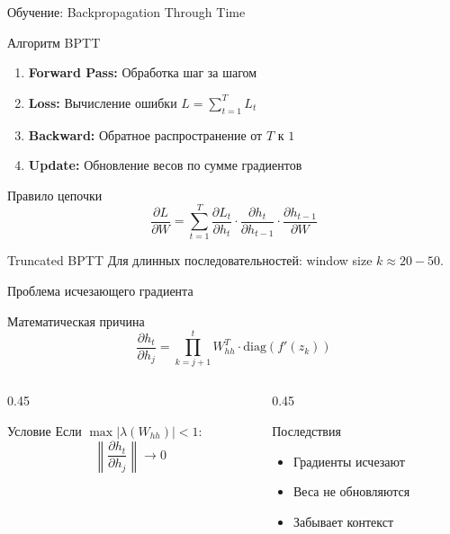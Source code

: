 \documentclass[aspectratio=169, 10pt]{beamer}
\begin{document}
\begin{frame}{Обучение: Backpropagation Through Time}
  \begin{block}{Алгоритм BPTT}
    \begin{enumerate}
      \item \textbf{Forward Pass:} Обработка шаг за шагом
      \item \textbf{Loss:} Вычисление ошибки $L = \sum_{t=1}^{T} L_t$       \item \textbf{Backward:} Обратное распространение от $T$ к $1$       \item \textbf{Update:} Обновление весов по сумме градиентов
    \end{enumerate}
  \end{block}
  
  \vspace{0.2cm}
  
  \begin{block}{Правило цепочки}
    \[
      \frac{\partial L}{\partial W} = \sum_{t=1}^{T} \frac{\partial L_t}{\partial h_t} \cdot \frac{\partial h_t}{\partial h_{t-1}} \cdot \frac{\partial h_{t-1}}{\partial W}
    \]
  \end{block}
  
  \begin{alertblock}{Truncated BPTT}
    Для длинных последовательностей: window size $k \approx 20-50$.
  \end{alertblock}
\end{frame}

\begin{frame}{Проблема исчезающего градиента}
  \begin{block}{Математическая причина}
    \[
      \frac{\partial h_t}{\partial h_j} = \prod_{k=j+1}^{t} W_{hh}^{T} \cdot \text{diag}(f'(z_k))
    \]
  \end{block}
  
  \vspace{0.2cm}
  
  \begin{columns}[T]
    \begin{column}{0.45\textwidth}
      \begin{alertblock}{Условие}
        Если $\max |\lambda(W_{hh})| < 1$:
        \[
          \left\| \frac{\partial h_t}{\partial h_j} \right\| \to 0
        \]
      \end{alertblock}
    \end{column}
    
    \begin{column}{0.45\textwidth}
      \begin{alertblock}{Последствия}
        \begin{itemize}
          \item Градиенты исчезают
          \item Веса не обновляются
          \item Забывает контекст
        \end{itemize}
      \end{alertblock}
    \end{column}
  \end{columns}
\end{frame}
\end{document}
